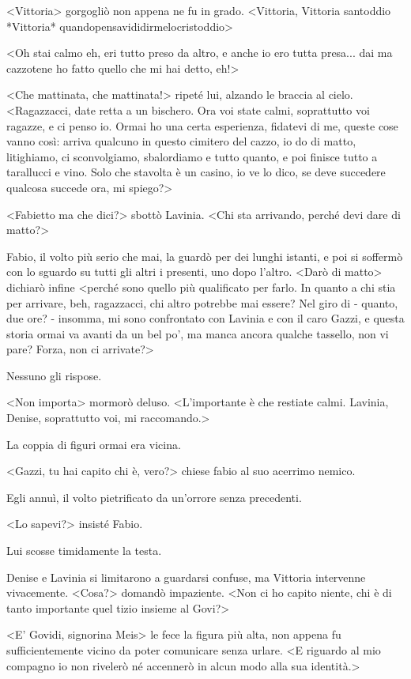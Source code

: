 <Vittoria> gorgogliò non appena ne fu in grado. <Vittoria, Vittoria santoddio *Vittoria* quandopensavididirmelocristoddio>

<Oh stai calmo eh, eri tutto preso da altro, e anche io ero tutta presa... dai ma cazzotene ho fatto quello che mi hai detto, eh!>

<Che mattinata, che mattinata!> ripeté lui, alzando le braccia al cielo. <Ragazzacci, date retta a un bischero. Ora voi state calmi, soprattutto voi ragazze, e ci penso io. Ormai ho una certa esperienza, fidatevi di me, queste cose vanno così: arriva qualcuno in questo cimitero del cazzo, io do di matto, litighiamo, ci sconvolgiamo, sbalordiamo e tutto quanto, e poi finisce tutto a tarallucci e vino. Solo che stavolta è un casino, io ve lo dico, se deve succedere qualcosa succede ora, mi spiego?>

<Fabietto ma che dici?> sbottò Lavinia. <Chi sta arrivando, perché devi dare di matto?>

Fabio, il volto più serio che mai, la guardò per dei lunghi istanti, e poi si soffermò con lo sguardo su tutti gli altri i presenti, uno dopo l'altro. <Darò di matto> dichiarò infine <perché sono quello più qualificato per farlo. In quanto a chi stia per arrivare, beh, ragazzacci, chi altro potrebbe mai essere? Nel giro di - quanto, due ore? - insomma, mi sono confrontato con Lavinia e con il caro Gazzi, e questa storia ormai va avanti da un bel po', ma manca ancora qualche tassello, non vi pare? Forza, non ci arrivate?>

Nessuno gli rispose.

<Non importa> mormorò deluso. <L'importante è che restiate calmi. Lavinia, Denise, soprattutto voi, mi raccomando.>

La coppia di figuri ormai era vicina.

<Gazzi, tu hai capito chi è, vero?> chiese fabio al suo acerrimo nemico. 

Egli annuì, il volto pietrificato da un'orrore senza precedenti.

<Lo sapevi?> insisté Fabio.

Lui scosse timidamente la testa.

Denise e Lavinia si limitarono a guardarsi confuse, ma Vittoria intervenne vivacemente. <Cosa?> domandò impaziente. <Non ci ho capito niente, chi è di tanto importante quel tizio insieme al Govi?>

<E' Govidi, signorina Meis> le fece la figura più alta, non appena fu sufficientemente vicino da poter comunicare senza urlare. <E riguardo al mio compagno io non rivelerò né accennerò in alcun modo alla sua identità.>

